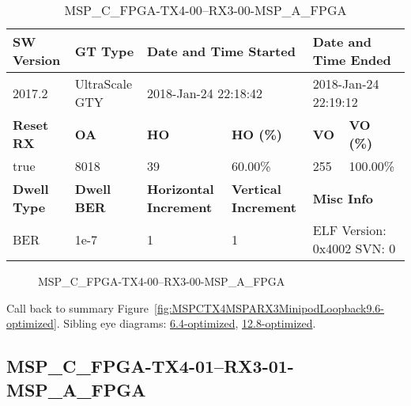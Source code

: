 \begin{table}[h]
\centering
\caption{MSP\_C\_FPGA-TX4-00--RX3-00-MSP\_A\_FPGA}
\label{tab:MSPCFPGATX400RX300MSPAFPGA9.6-optimized}
\begin{tabular}{@{}|l|l|l|l|l|l|@{}}
\toprule
\textbf{SW Version}                & \textbf{GT Type}   & \multicolumn{2}{l|}{\textbf{Date and Time Started}}            & \multicolumn{2}{l|}{\textbf{Date and Time Ended}}        \\ \midrule
2017.2                       & UltraScale GTY          & \multicolumn{2}{l|}{2018-Jan-24 22:18:42}                   & \multicolumn{2}{l|}{2018-Jan-24 22:19:12}               \\ \midrule
\textbf{Reset RX}                  & \textbf{OA} & \textbf{HO}   & \textbf{HO (\%)} & \textbf{VO} & \textbf{VO (\%)} \\ \midrule
true & 8018        & 39          & 60.00\%        & 255        & 100.00\%       \\ \midrule
\textbf{Dwell Type}                & \textbf{Dwell BER} & \textbf{Horizontal Increment} & \textbf{Vertical Increment}    & \multicolumn{2}{l|}{\textbf{Misc Info}}                  \\ \midrule
BER                            & 1e-7        & 1        & 1           & \multicolumn{2}{l|}{ELF Version: 0x4002 SVN: 0}                         \\ \bottomrule
\end{tabular}
\end{table}

\begin{figure}[h]
\caption{MSP\_C\_FPGA-TX4-00--RX3-00-MSP\_A\_FPGA} \label{fig:MSPCFPGATX400RX300MSPAFPGA9.6-optimized}
\end{figure}

Call back to summary Figure~\ref{fig:MSPCTX4MSPARX3MinipodLoopback9.6-optimized}.
Sibling eye diagrams: \hyperref[sec:MSPCFPGATX400RX300MSPAFPGA6.4-optimized]{6.4-optimized}, \hyperref[sec:MSPCFPGATX400RX300MSPAFPGA12.8-optimized]{12.8-optimized}.

\clearpage
\newpage


\subsection{MSP\_C\_FPGA-TX4-01--RX3-01-MSP\_A\_FPGA}\label{sec:MSPCFPGATX401RX301MSPAFPGA9.6-optimized}

